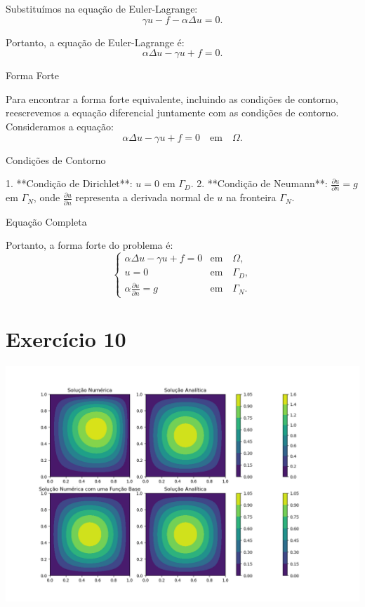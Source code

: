 \documentclass{article}
\begin{document}
Substituímos na equação de Euler-Lagrange:
\[
\gamma u - f - \alpha \Delta u = 0.
\]

Portanto, a equação de Euler-Lagrange é:
\[
\alpha \Delta u - \gamma u + f = 0.
\]

Forma Forte

Para encontrar a forma forte equivalente, incluindo as condições de contorno, reescrevemos a equação diferencial juntamente com as condições de contorno. Consideramos a equação:
\[
\alpha \Delta u - \gamma u + f = 0 \quad \text{em} \quad \Omega.
\]

Condições de Contorno

1. **Condição de Dirichlet**: \( u = 0 \) em \( \Gamma_D \).
2. **Condição de Neumann**: \(\frac{\partial u}{\partial n} = g\) em \( \Gamma_N \), onde \( \frac{\partial u}{\partial n} \) representa a derivada normal de \( u \) na fronteira \( \Gamma_N \).

Equação Completa

Portanto, a forma forte do problema é:
\[
\begin{cases}
\alpha \Delta u - \gamma u + f = 0 & \text{em} \quad \Omega, \\
u = 0 & \text{em} \quad \Gamma_D, \\
\alpha \frac{\partial u}{\partial n} = g & \text{em} \quad \Gamma_N.
\end{cases}
\]

\section{Exercício 10}

\begin{center}
    \includegraphics[width=1\textwidth]{exercicio10.png}
\end{center}
\end{document}
